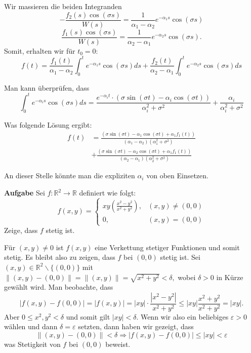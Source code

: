 Wir massieren die beiden Integranden
$$ -\frac{f_{2}(s) \cos (\sigma s)}{W(s)}=\frac{1}{\alpha_{1}-\alpha_{2}}
e^{-\alpha_{1} s} \cos (\sigma s)$$
$$\frac{f_{1}(s) \cos (\sigma s)}{W(s)}=\frac{1}{\alpha_{2}-\alpha_{1}} 
e^{-\alpha_{2} s} \cos (\sigma s) .$$
Somit, erhalten wir für $t_{0}=0:$
$$f(t)=\frac{f_{1}(t)}{\alpha_{1}-\alpha_{2}} \int_{0}^{t} e^{-\alpha_{1} s} 
\cos (\sigma s) d s+\frac{f_{2}(t)}{\alpha_{2}-\alpha_{1}} \int_{0}^{t} 
e^{-\alpha_{2} s} \cos (\sigma s) d s$$

Man kann überprüfen, dass
$$ \int_{0}^{t} e^{-\alpha_{i} s} \cos (\sigma s) d s=\frac{e^{-\alpha_{i} t}
\cdot\left(\sigma \sin (\sigma t)-\alpha_{i} \cos (\sigma t)\right)}{\alpha_{i}^{2}
+\sigma^{2}}+\frac{\alpha_{i}}{\alpha_{i}^{2}+\sigma^{2}}$$

Was folgende Lösung ergibt:
\begin{align*}
f(t)&=\frac{\left(\sigma \sin (\sigma t)-\alpha_{1} \cos (\sigma t)+\alpha_{1} f_{1}(t)\right)}{\left(\alpha_{1}-\alpha_{2}\right)\left(\alpha_{1}^{2}+\sigma^{2}\right)} \\ &+ \frac{\left(\sigma \sin (\sigma t)-\alpha_{2} \cos (\sigma t)+\alpha_{1} f_{1}(t)\right)}{\left(\alpha_{2}-\alpha_{1}\right)\left(\alpha_{2}^{2}+\sigma^{2}\right)}    
\end{align*}

An dieser Stelle könnte man die expliziten $\alpha_{i}$ von oben Einsetzen.

\hrulefill

\textbf{Aufgabe} Sei $f: \mathbb{R}^{2} \rightarrow \mathbb{R}$ definiert wie folgt:
$$ f(x, y)= \begin{cases}x y\left(\frac{x^{2}-y^{2}}{x^{2}+y^{2}}\right), & (x, y) \neq(0,0) \\ 
0, & (x, y)=(0,0)\end{cases} $$
Zeige, dass $f$ stetig ist. \smallskip

Für $(x, y) \neq 0$ ist $f(x, y)$ eine Verkettung stetiger Funktionen und somit stetig. Es
bleibt also zu zeigen, dass $f$ bei $(0,0)$ stetig ist. Sei $(x, y) \in \mathbb{R}^{2}
\backslash\{(0,0)\}$ mit $\|(x, y)-(0,0)\|=\|(x, y)\|=\sqrt{x^{2}+y^{2}}<\delta,$ wobei
$\delta>0$ in Kürze gewählt wird. Man beobachte, dass
$$ |f(x, y)-f(0,0)|=|f(x, y)|=|x y| \cdot \frac{\left|x^{2}-y^{2}\right|}{x^{2}+y^{2}} \leq|x y| \frac{x^{2}+y^{2}}{x^{2}+y^{2}}=|x y|. $$
Aber $0 \leq x^{2}, y^{2}<\delta$ und somit gilt $|x y|<\delta$. Wenn wir also ein beliebiges $\varepsilon>0$ wählen und dann $\delta=\varepsilon$ setzten, dann haben wir gezeigt, dass
$$\|(x, y)-(0,0)\|<\delta \Longrightarrow|f(x, y)-f(0,0)| \leq|x y|<\varepsilon$$
was Stetigkeit von $f$ bei $(0,0)$ beweist.

